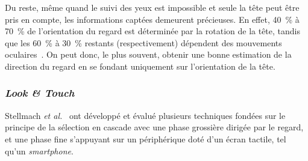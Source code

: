 	Du reste, même quand le suivi des yeux est impossible et seule la tête peut être pris en compte, les informations captées demeurent précieuses. En effet, 40~\%{} à 70~\%{} de l'orientation du regard est déterminée par la rotation de la tête, tandis que les 60~\%{} à 30~\%{} restants (respectivement) dépendent des mouvements oculaires~\cite{gauthier1991short}. On peut donc, le plus souvent, obtenir une bonne estimation de la direction du regard en se fondant uniquement sur l'orientation de la tête.
	
	\subsubsection{\emph{Look \&{} Touch}}
	Stellmach \emph{et al.}~\cite{stellmach2012look} ont développé et évalué plusieurs techniques fondées sur le principe de la sélection en cascade avec une phase grossière dirigée par le regard, et une phase fine s'appuyant sur un périphérique doté d'un écran tactile, tel qu'un \emph{smartphone}.
	
